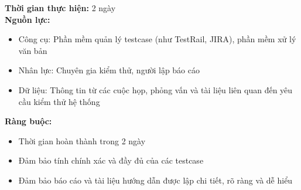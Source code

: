 {\begin{minipage}{\textwidth}
\begin{itemize}
    \end{itemize}
    \noindent \textbf{Thời gian thực hiện:} 2 ngày \\
    \noindent \textbf{Nguồn lực:}
    \begin{itemize}
        \item Công cụ: Phần mềm quản lý testcase (như TestRail, JIRA), phần mềm xử lý văn bản
        \item Nhân lực: Chuyên gia kiểm thử, người lập báo cáo
        \item Dữ liệu: Thông tin từ các cuộc họp, phỏng vấn và tài liệu liên quan đến yêu cầu kiểm thử hệ thống
    \end{itemize}
    \noindent \textbf{Ràng buộc:}
    \begin{itemize}
        \item Thời gian hoàn thành trong 2 ngày
        \item Đảm bảo tính chính xác và đầy đủ của các testcase
        \item Đảm bảo báo cáo và tài liệu hướng dẫn được lập chi tiết, rõ ràng và dễ hiểu
    \end{itemize}
    \end{minipage}
}
\newpage
{}    
